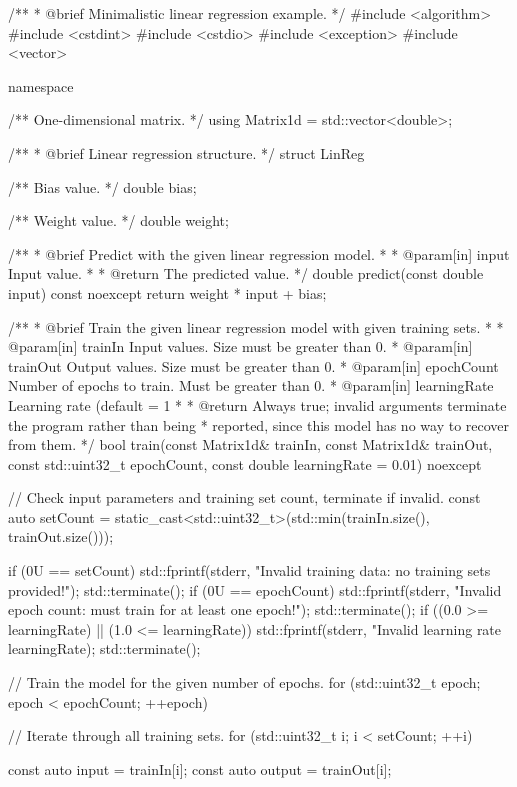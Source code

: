 \begin{cppcode}
/**
 * @brief Minimalistic linear regression example.
 */
#include <algorithm>
#include <cstdint>
#include <cstdio>
#include <exception>
#include <vector>

namespace
{
/** One-dimensional matrix. */
using Matrix1d = std::vector<double>;

/**
 * @brief Linear regression structure.
 */
struct LinReg
{
    /** Bias value. */
    double bias;

    /** Weight value. */
    double weight;

    /**
     * @brief Predict with the given linear regression model.
     *
     * @param[in] input Input value.
     *
     * @return The predicted value.
     */
    double predict(const double input) const noexcept { return weight * input + bias; }

    /**
     * @brief Train the given linear regression model with given training sets.
     *
     * @param[in] trainIn Input values. Size must be greater than 0.
     * @param[in] trainOut Output values. Size must be greater than 0.
     * @param[in] epochCount Number of epochs to train. Must be greater than 0.
     * @param[in] learningRate Learning rate (default = 1 %
     *
     * @return Always true; invalid arguments terminate the program rather than being
     *         reported, since this model has no way to recover from them.
     */
    bool train(const Matrix1d& trainIn, const Matrix1d& trainOut,
               const std::uint32_t epochCount, const double learningRate = 0.01) noexcept
    {
        // Check input parameters and training set count, terminate if invalid.
        const auto setCount = static_cast<std::uint32_t>(std::min(trainIn.size(), trainOut.size()));

        if (0U == setCount)
        {
            std::fprintf(stderr, "Invalid training data: no training sets provided!\n");
            std::terminate();
        }
        if (0U == epochCount)
        {
            std::fprintf(stderr, "Invalid epoch count: must train for at least one epoch!\n");
            std::terminate();
        }
        if ((0.0 >= learningRate) || (1.0 <= learningRate))
        {
            std::fprintf(stderr, "Invalid learning rate %
                learningRate);
            std::terminate();
        }

        // Train the model for the given number of epochs.
        for (std::uint32_t epoch{}; epoch < epochCount; ++epoch)
        {
            // Iterate through all training sets.
            for (std::uint32_t i{}; i < setCount; ++i)
            {
                const auto input  = trainIn[i];
                const auto output = trainOut[i];

}}}}}
\end{cppcode}
